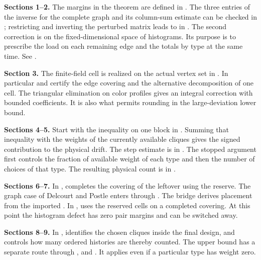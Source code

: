 \documentclass[english,11pt,a4paper]{article}
\begin{document}
\textbf{Sections 1--2.} The margins in the theorem are defined in . The three entries of the inverse for the complete graph and its column-sum estimate can be checked in ; restricting and inverting the perturbed matrix leads to  in . The second correction is on the fixed-dimensional space of histograms. Its purpose is to prescribe the load on each remaining edge and the totals by type at the same time. See .

\textbf{Section 3.} The finite-field cell is realized on the actual vertex set in . In particular  and  certify the edge covering and the alternative decomposition of one cell. The triangular elimination on color profiles gives an integral correction with bounded coefficients. It is also what permits rounding in the large-deviation lower bound.

\textbf{Sections 4--5.} Start with the inequality on one block in . Summing that inequality with the weights of the currently available cliques gives the signed contribution to the physical drift. The step estimate is  in . The stopped argument first controls the fraction of available weight of each type and then the number of choices of that type. The resulting physical count is  in .

\textbf{Sections 6--7.} In ,  completes the covering of the leftover using the reserve. The graph case of Delcourt and Postle enters through . The bridge derives placement from the imported . In ,  uses the reserved cells on a completed covering. At this point the histogram defect has zero pair margins and can be switched away.

\textbf{Sections 8--9.} In ,  identifies the chosen cliques inside the final design, and  controls how many ordered histories are thereby counted. The upper bound has a separate route through ,  and . It applies even if a particular type has weight zero.
\end{document}
